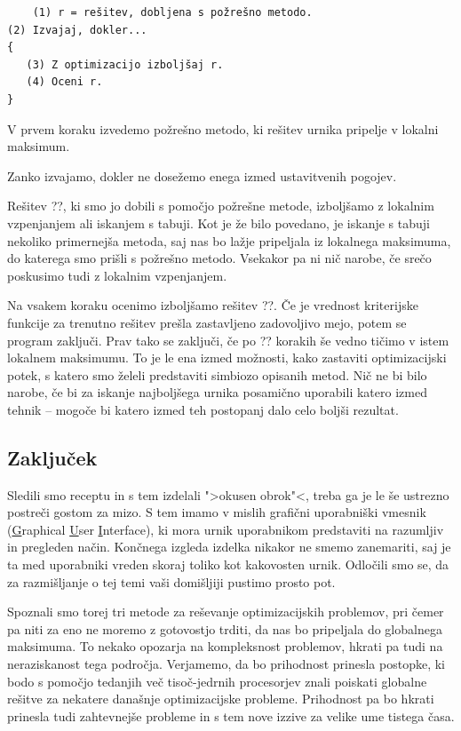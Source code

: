 \documentclass[a4paper, 10pt]{article}
\begin{document}
\begin{verbatim}
	(1) r = rešitev, dobljena s požrešno metodo.
(2) Izvajaj, dokler...
{
   (3) Z optimizacijo izboljšaj r.
   (4) Oceni r.
}
\end{verbatim}

   V prvem koraku izvedemo požrešno metodo, ki rešitev urnika pripelje v lokalni maksimum.

   Zanko izvajamo, dokler ne dosežemo enega izmed ustavitvenih pogojev.

   Rešitev ??, ki smo jo dobili s pomočjo požrešne metode, izboljšamo z lokalnim vzpenjanjem
   ali iskanjem s tabuji. Kot je že bilo povedano, je iskanje s tabuji nekoliko primernejša metoda,
   saj nas bo lažje pripeljala iz lokalnega maksimuma, do katerega smo prišli s požrešno metodo.
   Vsekakor pa ni nič narobe, če srečo poskusimo tudi z lokalnim vzpenjanjem.

   Na vsakem koraku ocenimo izboljšamo rešitev ??. Če je vrednost kriterijske funkcije
   za trenutno rešitev prešla zastavljeno zadovoljivo mejo, potem se program zaključi. Prav tako
   se zaključi, če po ?? korakih še vedno tičimo v istem lokalnem maksimumu.
%
To je le ena izmed možnosti, kako zastaviti optimizacijski potek, s katero smo želeli predstaviti
simbiozo opisanih metod. Nič ne bi bilo narobe, če bi za iskanje najboljšega urnika posamično
uporabili katero izmed tehnik -- mogoče bi katero izmed teh postopanj dalo celo boljši rezultat.

\subsection{Zaključek }%

Sledili smo receptu in s tem izdelali ">okusen obrok"<, treba ga je le še ustrezno postreči
gostom za mizo. S tem imamo v mislih grafični uporabniški vmesnik (\underline{G}raphical
\underline{U}ser \underline{I}nterface), ki mora urnik uporabnikom predstaviti na razumljiv in
pregleden način. Končnega izgleda izdelka nikakor ne smemo zanemariti, saj je ta med uporabniki
vreden skoraj toliko kot kakovosten urnik. Odločili smo se, da za razmišljanje o tej temi vaši
domišljiji pustimo prosto pot.

Spoznali smo torej tri metode za reševanje optimizacijskih problemov, pri čemer pa niti za eno
ne moremo z gotovostjo trditi, da nas bo pripeljala do globalnega maksimuma. To nekako opozarja
na kompleksnost problemov, hkrati pa tudi na neraziskanost tega področja. Verjamemo, da bo
prihodnost prinesla postopke, ki bodo s pomočjo tedanjih več tisoč-jedrnih procesorjev znali
poiskati globalne rešitve za nekatere današnje optimizacijske probleme. Prihodnost pa bo
hkrati prinesla tudi zahtevnejše probleme in s tem nove izzive za velike ume tistega časa.
\end{document}
